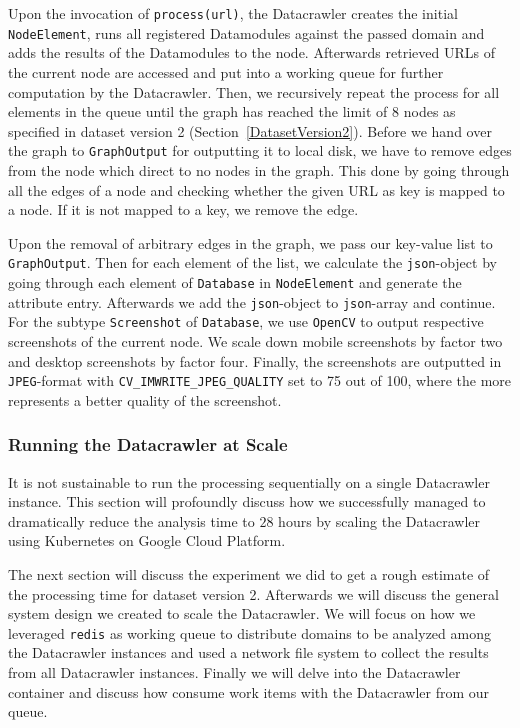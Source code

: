 Upon the invocation of \texttt{process(url)}, the Datacrawler creates the initial \texttt{NodeElement}, runs all registered Datamodules against the passed domain and adds the results of the Datamodules to the node. Afterwards retrieved URLs of the current node are accessed and put into a working queue for further computation by the Datacrawler. Then, we recursively repeat the process for all elements in the queue until the graph has reached the limit of 8 nodes as specified in dataset version 2 (Section~\ref{DatasetVersion2}). Before we hand over the graph to \texttt{GraphOutput} for outputting it to local disk, we have to remove edges from the node which direct to no nodes in the graph. This done by going through all the edges of a node and checking whether the given URL as key is mapped to a node. If it is not mapped to a key, we remove the edge.

Upon the removal of arbitrary edges in the graph, we pass our key-value list to \texttt{GraphOutput}. Then for each element of the list, we calculate the \texttt{json}-object by going through each element of \texttt{Database} in \texttt{NodeElement} and generate the attribute entry. Afterwards we add the \texttt{json}-object to \texttt{json}-array and continue. For the subtype \texttt{Screenshot} of \texttt{Database}, we use \texttt{OpenCV} to output respective screenshots of the current node. We scale down mobile screenshots by factor two and desktop screenshots by factor four. Finally, the screenshots are outputted in \texttt{JPEG}-format with \texttt{CV\_IMWRITE\_JPEG\_QUALITY} set to 75 out of 100, where the more represents a better quality of the screenshot. 

\subsubsection{Running the Datacrawler at Scale}
\label{datacrawler_scale}
It is not sustainable to run the processing sequentially on a single Datacrawler instance. This section will profoundly discuss how we successfully managed to dramatically reduce the analysis time to $28$ hours by scaling the Datacrawler using Kubernetes on Google Cloud Platform. 

The next section will discuss the experiment we did to get a rough estimate of the processing time for dataset version 2. Afterwards we will discuss the general system design we created to scale the Datacrawler. We will focus on how we leveraged \texttt{redis} as working queue to distribute domains to be analyzed among the Datacrawler instances and used a network file system to collect the results from all Datacrawler instances. Finally we will delve into the Datacrawler container and discuss how consume work items with the Datacrawler from our queue.

